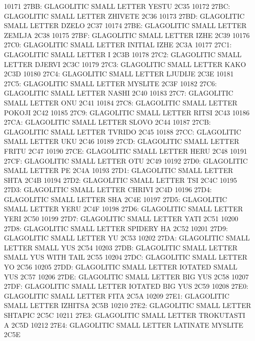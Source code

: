  10171 27BB: GLAGOLITIC SMALL LETTER YESTU 2C35
 10172 27BC: GLAGOLITIC SMALL LETTER ZHIVETE 2C36
 10173 27BD: GLAGOLITIC SMALL LETTER DZELO 2C37
 10174 27BE: GLAGOLITIC SMALL LETTER ZEMLJA 2C38
 10175 27BF: GLAGOLITIC SMALL LETTER IZHE 2C39
 10176 27C0: GLAGOLITIC SMALL LETTER INITIAL IZHE 2C3A
 10177 27C1: GLAGOLITIC SMALL LETTER I 2C3B
 10178 27C2: GLAGOLITIC SMALL LETTER DJERVI 2C3C
 10179 27C3: GLAGOLITIC SMALL LETTER KAKO 2C3D
 10180 27C4: GLAGOLITIC SMALL LETTER LJUDIJE 2C3E
 10181 27C5: GLAGOLITIC SMALL LETTER MYSLITE 2C3F
 10182 27C6: GLAGOLITIC SMALL LETTER NASHI 2C40
 10183 27C7: GLAGOLITIC SMALL LETTER ONU 2C41
 10184 27C8: GLAGOLITIC SMALL LETTER POKOJI 2C42
 10185 27C9: GLAGOLITIC SMALL LETTER RITSI 2C43
 10186 27CA: GLAGOLITIC SMALL LETTER SLOVO 2C44
 10187 27CB: GLAGOLITIC SMALL LETTER TVRIDO 2C45
 10188 27CC: GLAGOLITIC SMALL LETTER UKU 2C46
 10189 27CD: GLAGOLITIC SMALL LETTER FRITU 2C47
 10190 27CE: GLAGOLITIC SMALL LETTER HERU 2C48
 10191 27CF: GLAGOLITIC SMALL LETTER OTU 2C49
 10192 27D0: GLAGOLITIC SMALL LETTER PE 2C4A
 10193 27D1: GLAGOLITIC SMALL LETTER SHTA 2C4B
 10194 27D2: GLAGOLITIC SMALL LETTER TSI 2C4C
 10195 27D3: GLAGOLITIC SMALL LETTER CHRIVI 2C4D
 10196 27D4: GLAGOLITIC SMALL LETTER SHA 2C4E
 10197 27D5: GLAGOLITIC SMALL LETTER YERU 2C4F
 10198 27D6: GLAGOLITIC SMALL LETTER YERI 2C50
 10199 27D7: GLAGOLITIC SMALL LETTER YATI 2C51
 10200 27D8: GLAGOLITIC SMALL LETTER SPIDERY HA 2C52
 10201 27D9: GLAGOLITIC SMALL LETTER YU 2C53
 10202 27DA: GLAGOLITIC SMALL LETTER SMALL YUS 2C54
 10203 27DB: GLAGOLITIC SMALL LETTER SMALL YUS WITH TAIL 2C55
 10204 27DC: GLAGOLITIC SMALL LETTER YO 2C56
 10205 27DD: GLAGOLITIC SMALL LETTER IOTATED SMALL YUS 2C57
 10206 27DE: GLAGOLITIC SMALL LETTER BIG YUS 2C58
 10207 27DF: GLAGOLITIC SMALL LETTER IOTATED BIG YUS 2C59
 10208 27E0: GLAGOLITIC SMALL LETTER FITA 2C5A
 10209 27E1: GLAGOLITIC SMALL LETTER IZHITSA 2C5B
 10210 27E2: GLAGOLITIC SMALL LETTER SHTAPIC 2C5C
 10211 27E3: GLAGOLITIC SMALL LETTER TROKUTASTI A 2C5D
 10212 27E4: GLAGOLITIC SMALL LETTER LATINATE MYSLITE 2C5E
 